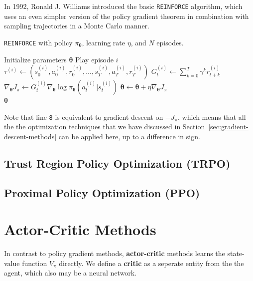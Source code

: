 \documentclass[12pt]{report}
\theoremstyle{definition}
\theoremstyle{remark}
\begin{document}
In 1992, Ronald J. Williams introduced the basic \texttt{REINFORCE} algorithm, which uses an even simpler version of the policy gradient theorem in combination with sampling trajectories in a Monte Carlo manner.~\cite{williams_simple_1992}
\begin{algorithm}
    \caption{\texttt{REINFORCE} with policy $\pi_{\boldsymbol{\theta}}$, learning rate $\eta$, and $N$ episodes.}\label{alg:REINFORCE}
    \begin{algorithmic}[1]
        \State Initialize parameters $\boldsymbol{\theta}$
            \State Play episode $i$
            \State $\tau^{(i)} \leftarrow (s_0^{(i)}, a_0^{(i)}, r_0^{(i)}, \ldots, s_T^{(i)}, a_T^{(i)}, r_T^{(i)})$
                \State $G_t^{(i)} \leftarrow \sum_{k=0}^{T} \gamma^k r_{t+k}^{(i)}$
                \State $\nabla_{\boldsymbol{\theta}} J_\pi \leftarrow G_t^{(i)} \nabla_{\boldsymbol{\theta}} \log \pi_{\boldsymbol{\theta}}(a_t^{(i)} | s_t^{(i)})$
                \State $\boldsymbol{\theta} \leftarrow \boldsymbol{\theta} + \eta \nabla_{\boldsymbol{\theta}} J_\pi$
            \EndFor
        \EndFor \\
        \Return $\boldsymbol{\theta}$
    \end{algorithmic}
\end{algorithm}
Note that line \texttt{8} is equivalent to gradient descent on $-J_\pi$, which means that all the the optimization techniques that we have discussed in Section~\ref{sec:gradient-descent-methods} can be applied here, up to a difference in sign.

\subsection{Trust Region Policy Optimization (TRPO)}
\cite{schulman_trust_2015}


\subsection{Proximal Policy Optimization (PPO)}
\cite{schulman_proximal_2017}

\section{Actor-Critic Methods}
In contrast to policy gradient methods, \textbf{actor-critic} methods learns the state-value function $V_\pi$ directly. We define a \textbf{critic} as a seperate entity from the the agent, which also may be a neural network.
\end{document}
